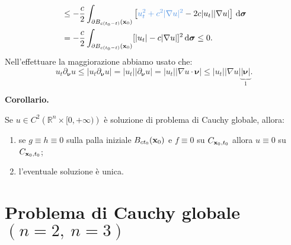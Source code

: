 \begin{dimostrazione}
\begin{align*}
                   & \leq -\frac{c}{2}\int _{\partial B_{c(t_{0} -t)}(\x_{0})}\left[\textcolor[rgb]{0.29,0.56,0.89}{u_{t}^{2}+c^{2}| \nabla u| ^{2}} -2c| u_{t}| | \nabla u| \right] \dsig                                                       \\
                   & =-\frac{c}{2}\int _{\partial B_{c(t_{0} -t)}(\x_{0})}[| u_{t}| -c| \nabla u| ]^{2} \dsig \leq 0.
    \end{align*}
    Nell'effettuare la maggiorazione abbiamo usato che:
    \begin{equation*}
        u_{t} \partial _{\bm{\nu }} u\leq |u_{t} \partial _{\bm{\nu }} u|=|u_{t} ||\partial _{\bm{\nu }} u|=|u_{t} ||\nabla u\cdotp \bm{\nu } |\leq |u_{t} ||\nabla u|\underbrace{|\bm{\nu } |}_{1}.
    \end{equation*}
\end{dimostrazione}
\textbf{Corollario.}

Se $u\in C^{2}\left(\mathbb{R}^{n} \times [ 0,+\infty)\right)$ è soluzione di problema di Cauchy globale, allora:
\begin{enumerate}
    \item se $g\equiv h\equiv 0$ sulla palla iniziale $B_{ct_{0}}(\mathbf{x}_{0})$ e $f\equiv 0$ su $C_{\mathbf{x}_{0} ,t_{0}}$ allora $u\equiv 0$ su $C_{\mathbf{x}_{0} ,t_{0}}$;
    \item l'eventuale soluzione è unica.
\end{enumerate}

\section{Problema di Cauchy globale \texorpdfstring{$(n=2,\ n=3)$}{(n=2, n=3)}}


